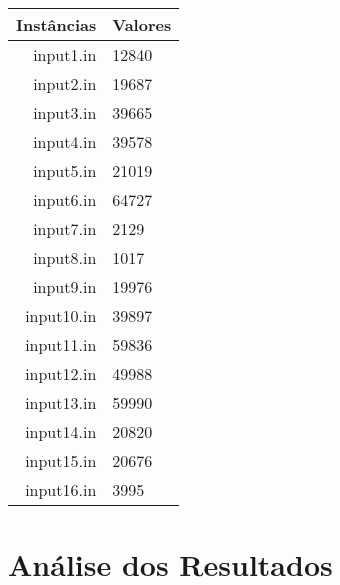 \documentclass[a4paper, 12pt]{article}
\begin{document}
\begin{table}[h]
    \begin{tabular}{|r|l|}
        \hline
        \textbf{Instâncias} &  \textbf{Valores} \\ \hline
        input1.in  &    12840 \\ \hline
        input2.in  &    19687 \\ \hline
        input3.in  &    39665 \\ \hline 
        input4.in  &    39578 \\ \hline
        input5.in  &    21019 \\ \hline
        input6.in  &    64727 \\ \hline
        input7.in  &     2129 \\ \hline
        input8.in  &     1017 \\ \hline
        input9.in  &    19976 \\ \hline
        input10.in &    39897 \\ \hline
        input11.in &    59836 \\ \hline
        input12.in &    49988 \\ \hline
        input13.in &    59990 \\ \hline
        input14.in &    20820 \\ \hline
        input15.in &    20676 \\ \hline
        input16.in &     3995 \\ \hline
    \end{tabular}
\end{table}

\clearpage

\section{Análise dos Resultados}
\clearpage
\end{document}
